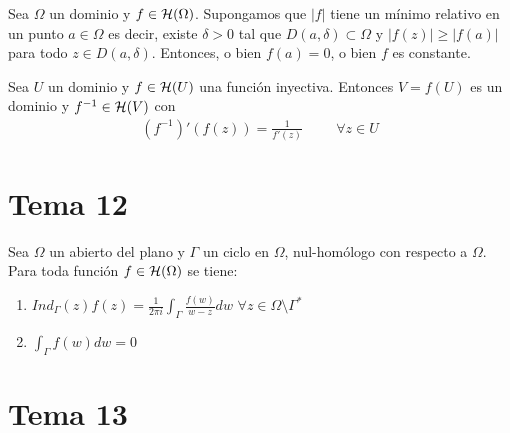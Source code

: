 \documentclass[12pt]{article}
\begin{document}
    \begin{teo} Sea $\Omega$ un dominio y $f\in \mathcal{H}(\Omega)$. Supongamos que $|f|$ tiene un mínimo relativo en un punto $a\in \Omega$ es decir, existe $\delta > 0$ tal que $D(a, \delta)\subset \Omega$ y $|f(z)| \geq |f(a)|$ para todo $z\in D(a, \delta)$. Entonces, o bien $f(a)=0$, o bien $f$ es constante.
    \end{teo}

    \begin{teo} Sea $U$ un dominio y $f\in \mathcal{H}(U)$ una función inyectiva. Entonces $V=f(U)$ es un dominio y $f^{-1}\in \mathcal{H}(V)$ con 
    \begin{gather*}
        (f^{-1})'(f(z)) = \frac{1}{f'(z)} \hspace{1cm} \forall z \in U
    \end{gather*}
    \end{teo}

    \newpage

    \section{Tema 12}

    \begin{teo} Sea $\Omega$ un abierto del plano y $\Gamma$ un ciclo en $\Omega$, nul-homólogo con respecto a $\Omega$. Para toda función $f\in \mathcal{H}(\Omega)$ se tiene:
    \begin{enumerate}
        \item $\displaystyle Ind_\Gamma (z)f(z) = \frac{1}{2\pi i} \int_\Gamma \frac{f(w)}{w-z} dw$ \hspace{1cm} $\forall z \in \Omega \setminus \Gamma^*$
        \item $\displaystyle \int_\Gamma f(w) dw = 0$
    \end{enumerate}
    \end{teo}

    \newpage

    \section{Tema 13}
\end{document}
